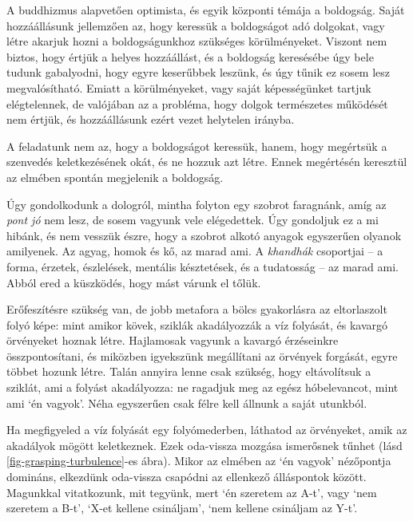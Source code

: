
A buddhizmus alapvetően optimista, és egyik központi témája a boldogság.
Saját hozzáállásunk jellemzően az, hogy keressük a boldogságot adó
dolgokat, vagy létre akarjuk hozni a boldogságunkhoz szükséges
körülményeket. Viszont nem biztos, hogy értjük a helyes hozzáállást, és
a boldogság keresésébe úgy bele tudunk gabalyodni, hogy egyre keserűbbek
leszünk, és úgy tűnik ez sosem lesz megvalósítható. Emiatt a
körülményeket, vagy saját képességünket tartjuk elégtelennek, de
valójában az a probléma, hogy dolgok természetes működését nem értjük,
és hozzáállásunk ezért vezet helytelen irányba.

A feladatunk nem az, hogy a boldogságot keressük, hanem, hogy megértsük
a szenvedés keletkezésének okát, és ne hozzuk azt létre. Ennek
megértésén keresztül az elmében spontán megjelenik a boldogság.

Úgy gondolkodunk a dologról, mintha folyton egy szobrot faragnánk, amíg
az \emph{pont jó} nem lesz, de sosem vagyunk vele elégedettek. Úgy
gondoljuk ez a mi hibánk, és nem vesszük észre, hogy a szobrot alkotó
anyagok egyszerűen olyanok amilyenek. Az agyag, homok és kő, az marad
ami. A \emph{khandhák} csoportjai -- a forma, érzetek, észlelések,
mentális késztetések, és a tudatosság -- az marad ami. Abból ered a
küszködés, hogy mást várunk el tőlük.

Erőfeszítésre szükség van, de jobb metafora a bölcs gyakorlásra az
eltorlaszolt folyó képe: mint amikor kövek, sziklák akadályozzák a víz
folyását, és kavargó örvényeket hoznak létre. Hajlamosak vagyunk a
kavargó érzéseinkre összpontosítani, és miközben igyekszünk megállítani
az örvények forgását, egyre többet hozunk létre. Talán annyira lenne
csak szükség, hogy eltávolítsuk a sziklát, ami a folyást akadályozza: ne
ragadjuk meg az egész hóbelevancot, mint ami `én vagyok'. Néha
egyszerűen csak félre kell állnunk a saját utunkból.

Ha megfigyeled a víz folyását egy folyómederben, láthatod az örvényeket,
amik az akadályok mögött keletkeznek. Ezek oda-vissza mozgása ismerősnek
tűnhet (lásd \ref{fig-grasping-turbulence}-es ábra). Mikor az elmében az
`én vagyok' nézőpontja domináns, elkezdünk oda-vissza csapódni az
ellenkező álláspontok között. Magunkkal vitatkozunk, mit tegyünk, mert
`én szeretem az A-t', vagy `nem szeretem a B-t', `X-et kellene
csináljam', `nem kellene csináljam az Y-t'.

\enlargethispage*{\baselineskip}

